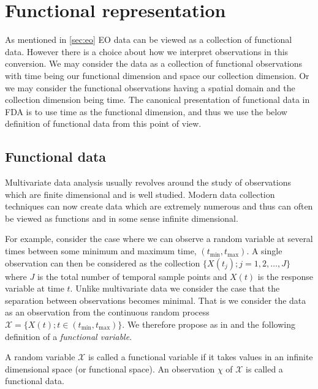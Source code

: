 \section{Functional representation \label{sec:fr}}
As mentioned in \ref{sec:eo} EO data can be viewed as a collection of functional data.
However there is a choice about how we interpret observations in this conversion.
We may consider the data as a collection of functional observations with time being our functional dimension and space our collection dimension.
Or we may consider the functional observations having a spatial domain and the collection dimension being time.
The canonical presentation of functional data in FDA is to use time as the functional dimension, \citep{ramsay_functional_2010} and thus we use the below definition of functional data from this point of view. 

\subsection{Functional data \label{ssec:fd}}
Multivariate data analysis usually revolves around the study of observations which are finite dimensional and is well studied.
Modern data collection techniques can now create data which are extremely numerous and thus can often be viewed as functions and in some sense infinite dimensional.

For example, \citeauthor{ferraty_nonparametric_2006} consider the case where we can observe a random variable at several times between some minimum and maximum time, $\left( t_{\text{min}}, t_{\text{max}} \right)$.
A single observation can then be considered as the collection $ \{ X(t_j) ; j=1,2,\dots, J\}$ where $J$ is the total number of temporal sample points and $X(t)$ is the response variable at time $t$.
Unlike multivariate data we consider the case that the separation between observations becomes minimal.
That is we consider the data as an observation from the continuous random process $\mathcal{X} = \{X(t); t \in \left( t_\text{min}, t_\text{max} \right)\}$.
We therefore propose as in \citep{ferraty_nonparametric_2006} and \citep{shi_gaussian_2011} the following definition of a \textit{functional variable}.

 \begin{definition}
	A random variable $\mathcal{X}$ is called a functional variable if it takes values in an infinite dimensional space (or functional space). An observation $\chi$ of $\mathcal{X}$ is called a functional data.
	\label{def:functional_variable}
\end{definition}

